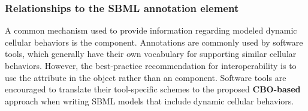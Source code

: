 
\subsubsection{Relationships to the SBML annotation element}
\label{subsubsec:CBO&Annot}

A common mechanism used to provide information regarding modeled dynamic cellular behaviors is the  \Annotation component. Annotations are commonly used by software tools, which generally have their own vocabulary for supporting similar cellular behaviors. However, the best-practice recommendation for interoperability is to use the  attribute in the \Event object rather than an \Annotation component. Software tools are encouraged to translate their tool-specific \Annotation schemes to the proposed \textbf{CBO-based} approach when writing SBML models that include dynamic cellular behaviors.
